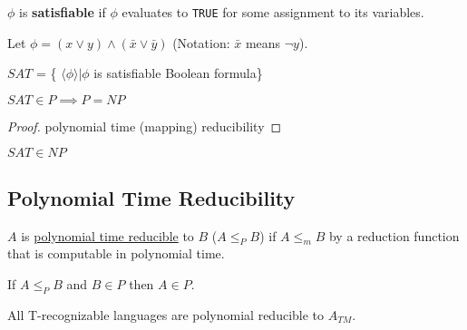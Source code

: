 \begin{definition}
    \(\phi\) is \textbf{satisfiable} if \(\phi\) evaluates to \verb|TRUE| for some assignment to its variables. 
\end{definition}

\begin{example}
    Let \(\phi = (x \lor y) \land (\bar{x} \lor \bar{y})\) (Notation: \(\bar{x}\) means \(\neg y\)). 
\end{example}

\begin{definition}
    \(SAT\) = \{ \(\langle \phi \rangle | \phi\) is satisfiable Boolean formula\} 
\end{definition}

\begin{definition}
    \(SAT \in P \implies P = NP\)  
\end{definition}
\begin{proof}
    polynomial time (mapping) reducibility
\end{proof}

\begin{remark}
    \(SAT \in NP\) 
\end{remark}

\subsection{Polynomial Time Reducibility}
\begin{definition}
    \(A\) is \underline{polynomial time reducible} to \(B\) (\(A \leq_P B\))  if \(A \leq_m B\) by a reduction function that is computable in polynomial time.
\end{definition}
\begin{theorem}
    If \( A \leq_P B\) and \(B \in P\) then \(A \in P\). 
\end{theorem}

\begin{note}
    All T-recognizable languages are polynomial reducible to \(A_{TM}\).   
\end{note}